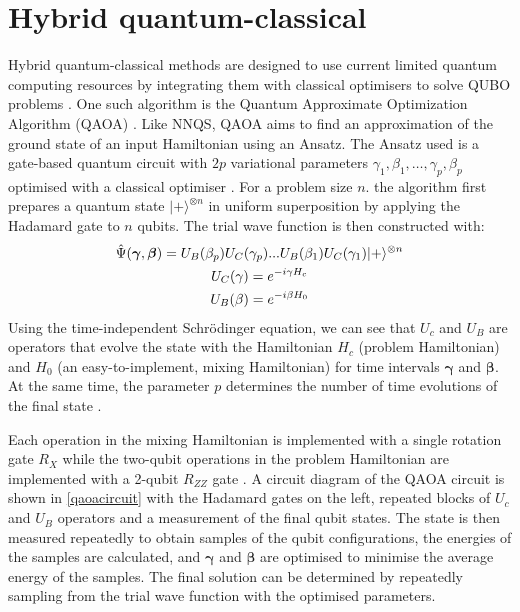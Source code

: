 \section{Hybrid quantum-classical}
Hybrid quantum-classical methods are designed to use current limited quantum computing resources by integrating them with classical optimisers to solve QUBO problems \cite{b32}. One such algorithm is the Quantum Approximate Optimization Algorithm (QAOA) \cite{b23}. Like NNQS, QAOA aims to find an approximation of the ground state of an input Hamiltonian using an Ansatz. The Ansatz used is a gate-based quantum circuit with $2p$ variational parameters $\gamma_1, \beta_1, \ldots, \gamma_p, \beta_p$ optimised with a classical optimiser \cite{b34}. For a problem size $n$. the algorithm first prepares a quantum state $| + \rangle^{\otimes n}$ in uniform superposition by applying the Hadamard gate to $n$ qubits. The trial wave function is then constructed with:
\begin{gather}
    \Hat{\Psi}(\boldsymbol{\gamma}, \boldsymbol{\beta}) = U_B(\beta_p) U_C(\gamma_p)...U_B(\beta_1) U_C(\gamma_1) | + \rangle^{\otimes n} \\
    U_C(\gamma) = e^{-i\gamma H_c} \\
    U_B(\beta) = e^{-i\beta H_0}
\end{gather}
Using the time-independent Schrödinger equation, we can see that $U_c$ and $U_B$ are operators that evolve the state with the Hamiltonian $H_c$ (problem Hamiltonian) and $H_0$ (an easy-to-implement, mixing Hamiltonian) for time intervals $\boldsymbol{\gamma}$ and $\boldsymbol{\beta}$. At the same time, the parameter $p$ determines the number of time evolutions of the final state \cite{b34}.

Each operation in the mixing Hamiltonian is implemented with a single rotation gate $R_X$ while the two-qubit operations in the problem Hamiltonian are implemented with a 2-qubit $R_{ZZ}$ gate \cite{qaoareview}. A circuit diagram of the QAOA circuit is shown in \autoref{qaoacircuit} with the Hadamard gates on the left, repeated blocks of $U_c$ and $U_B$ operators and a measurement of the final qubit states. The state is then measured repeatedly to obtain samples of the qubit configurations, the energies of the samples are calculated, and $\boldsymbol{\gamma}$ and $\boldsymbol{\beta}$ are optimised to minimise the average energy of the samples. The final solution can be determined by repeatedly sampling from the trial wave function with the optimised parameters.


